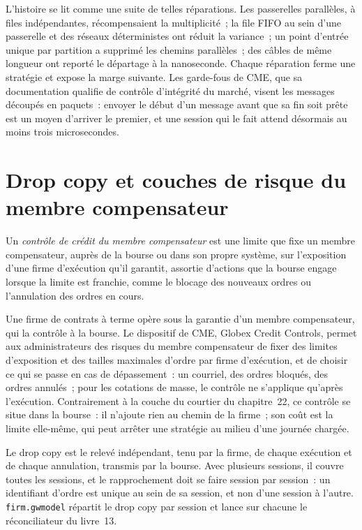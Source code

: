 L'histoire se lit comme une suite de telles réparations. Les passerelles parallèles, à files indépendantes, récompensaient la multiplicité~; la file FIFO au sein d'une
passerelle et des réseaux déterministes ont réduit la variance~; un point d'entrée unique par partition a supprimé les chemins parallèles~; des
câbles de même longueur ont reporté le départage à la nanoseconde. Chaque réparation ferme une stratégie et expose la marge suivante. Les garde-fous de CME, que sa documentation qualifie de contrôle
d'intégrité du marché, visent les messages découpés en paquets~: envoyer le début d'un message avant
que sa fin soit prête est un moyen d'arriver le premier, et une session qui le fait attend désormais au moins trois microsecondes.

\section{Drop copy et couches de risque du membre compensateur}

\begin{definition}\label{def:nw:futures-connectivity:credit}
Un \emph{contrôle de crédit du membre compensateur} est une limite que fixe un membre compensateur, auprès de la bourse
ou dans son propre système, sur l'exposition d'une firme d'exécution qu'il garantit, assortie d'actions que la bourse engage lorsque la limite est
franchie, comme le blocage des nouveaux ordres ou l'annulation des ordres en cours.
\end{definition}

Une firme de contrats à terme opère sous la garantie d'un membre compensateur, qui la contrôle à la bourse. Le dispositif de CME,
Globex Credit Controls, permet aux administrateurs des risques du membre compensateur de fixer des limites d'exposition et des tailles maximales d'ordre par firme d'exécution, et de choisir
ce qui se passe en cas de dépassement~: un courriel, des ordres bloqués, des ordres annulés~; pour les cotations de masse, le contrôle ne s'applique qu'après l'exécution.
Contrairement à la couche du courtier du chapitre~22, ce contrôle se situe dans la bourse~: il n'ajoute rien au chemin de la firme~; son coût
est la limite elle-même, qui peut arrêter une stratégie au milieu d'une journée chargée.

Le drop copy est le relevé indépendant, tenu par la firme, de chaque exécution et de chaque annulation, transmis par la bourse. Avec plusieurs sessions, il
couvre toutes les sessions, et le rapprochement doit se faire session par session~: un identifiant d'ordre est unique au sein de sa session, et non d'une session à l'autre.
\texttt{firm.gwmodel} répartit le drop copy par session et lance sur chacune le réconciliateur du livre~13.

